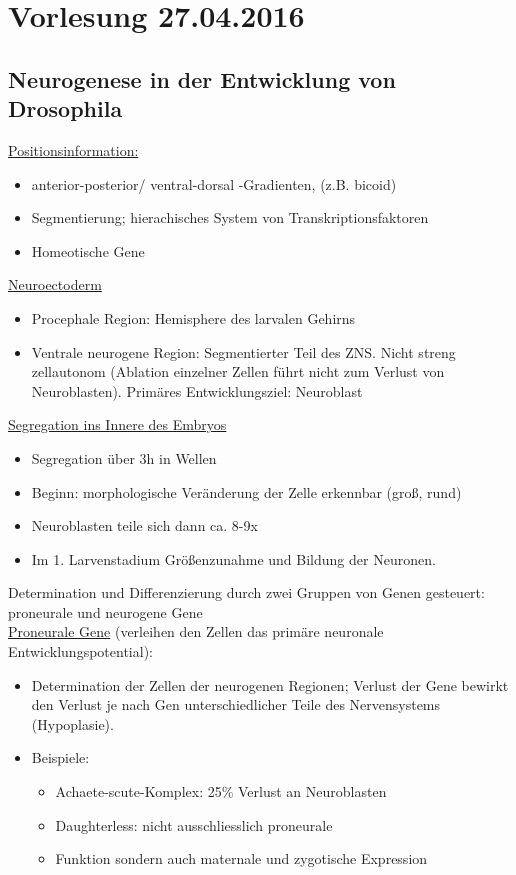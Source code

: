 \section{Vorlesung 27.04.2016}

\subsection{Neurogenese in der Entwicklung von Drosophila}
\underline{Positionsinformation:}
\begin{itemize}
	\item anterior-posterior/ ventral-dorsal -Gradienten, (z.B. bicoid)
	\item Segmentierung; hierachisches System von Transkriptionsfaktoren
	\item Homeotische Gene
\end{itemize}

\underline{Neuroectoderm}
\begin{itemize}
	\item Procephale Region: Hemisphere des larvalen Gehirns
	\item Ventrale neurogene Region: Segmentierter Teil des ZNS. Nicht streng zellautonom (Ablation einzelner Zellen führt nicht zum Verlust von Neuroblasten). Primäres Entwicklungsziel: Neuroblast
\end{itemize}

\underline{Segregation ins Innere des Embryos}
\begin{itemize}
	\item Segregation über 3h in Wellen
	\item Beginn: morphologische Veränderung der Zelle erkennbar (groß, rund)
	\item Neuroblasten teile sich dann ca. 8-9x
	\item Im 1. Larvenstadium Größenzunahme und Bildung der Neuronen.
\end{itemize}

Determination und Differenzierung durch zwei Gruppen von Genen gesteuert: proneurale und neurogene Gene\\

\underline{Proneurale Gene} (verleihen den Zellen das primäre neuronale Entwicklungspotential):
\begin{itemize}
	\item Determination der Zellen der neurogenen Regionen; Verlust der Gene bewirkt den Verlust je nach Gen unterschiedlicher Teile des Nervensystems (Hypoplasie).
	\item Beispiele:
		\begin{itemize}
			\item Achaete-scute-Komplex: 25\% Verlust an Neuroblasten
			\item Daughterless: nicht ausschliesslich proneurale 				\item Funktion sondern auch maternale und zygotische Expression
		\end{itemize}
\end{itemize}

